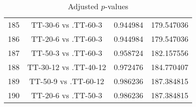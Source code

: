 \documentclass[a4paper,10pt]{article}
\begin{document}
\begin{landscape}
\begin{table}[!htp]
\begin{tabular}{cccc}
185&TT-30-6 vs .TT-60-3&0.944984&179.547036\\
186&TT-20-6 vs .TT-60-3&0.944984&179.547036\\
187&TT-50-3 vs .TT-60-3&0.958724&182.157556\\
188&TT-30-12 vs .TT-40-12&0.972476&184.770407\\
189&TT-50-9 vs .TT-60-12&0.986236&187.384815\\
190&TT-20-6 vs .TT-50-3&0.986236&187.384815\\
\hline
\end{tabular}
\caption{Adjusted $p$-values}
\end{table}

\end{landscape}
\end{document}
